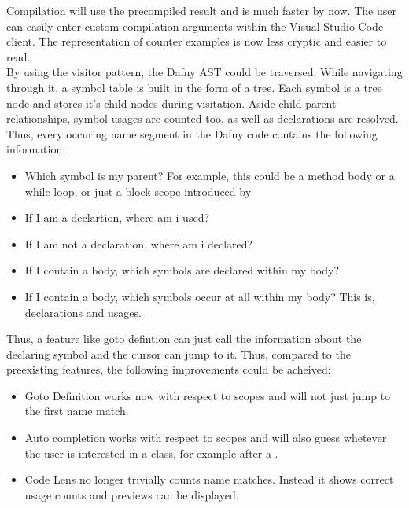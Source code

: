 Compilation will use the precompiled result and is much faster by now. The user can easily enter custom compilation arguments within the Visual Studio Code client. The representation of counter examples is now less cryptic and easier to read.\\

By using the visitor pattern, the Dafny AST could be traversed. While navigating through it, a symbol table is built in the form of a tree. Each symbol is a tree node and stores it's child nodes during visitation. Aside child-parent relationships, symbol usages are counted too, as well as declarations are resolved. Thus, every occuring name segment in the Dafny code contains the following information:
\begin{itemize}
    \item Which symbol is my parent? For example, this could be a method body or a while loop, or just a block scope introduced by \code{\string{$\ddots$\string}}
    \item If I am a declartion, where am i used?
    \item If I am not a declaration, where am i declared?
    \item If I contain a body, which symbols are declared within my body?
    \item If I contain a body, which symbols occur at all within my body? This is, declarations and usages.
\end{itemize}
Thus, a feature like goto defintion can just call the information about the declaring symbol and the cursor can jump to it. Thus, compared to the preexisting features, the following improvements could be acheived:
\begin{itemize}
    \item Goto Definition works now with respect to scopes and will not just jump to the first name match. 
    \item Auto completion works with respect to scopes and will also guess whetever the user is interested in a class, for example after a .
    \item Code Lens no longer trivially counts name matches. Instead it shows correct usage counts and previews can be displayed.
\end{itemize}

 

